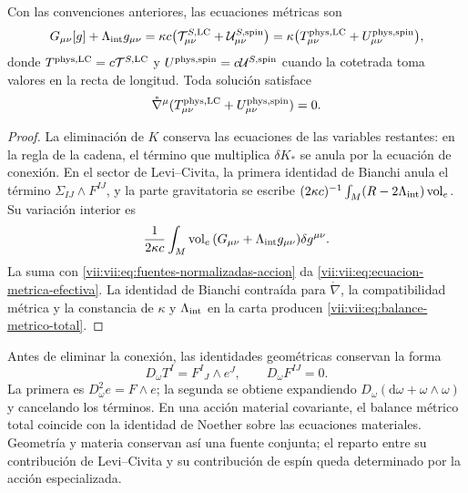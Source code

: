 \begin{proposition}
\label{vii:vii:prop:fuente-metrica-balance}
Con las convenciones anteriores, las ecuaciones métricas son
\begin{equation}
 G_{\mu\nu}[g]+\Lambda_{\rm int}g_{\mu\nu}
 =\kappa c\bigl(\mathcal T^{S,\rm LC}_{\mu\nu}
                    +\mathcal U^{S,\rm spin}_{\mu\nu}\bigr)
 =\kappa\bigl(T^{\rm phys,LC}_{\mu\nu}
                    +U^{\rm phys,spin}_{\mu\nu}\bigr),
 \label{vii:vii:eq:ecuacion-metrica-efectiva}
\end{equation}
donde \(T^{\rm phys,LC}=c\mathcal T^{S,\rm LC}\) y
\(U^{\rm phys,spin}=c\mathcal U^{S,\rm spin}\) cuando la
cotetrada toma valores en la recta de longitud. Toda solución satisface
\begin{equation}
 \mathring\nabla^\mu
   (T^{\rm phys,LC}_{\mu\nu}+U^{\rm phys,spin}_{\mu\nu})=0.
 \label{vii:vii:eq:balance-metrico-total}
\end{equation}
\end{proposition}
\begin{proof}
La eliminación de \(K\) conserva las ecuaciones de las variables
restantes: en la regla de la cadena, el término que multiplica
\(\delta K_*\) se anula por la ecuación de conexión. En el sector
de Levi--Civita, la primera identidad de Bianchi anula el término
\(\Sigma_{IJ}\wedge F^{IJ}\), y la parte gravitatoria se escribe
\((2\kappa c)^{-1}\int_M(R-2\Lambda_{\rm int})\operatorname{vol}_e\).
Su variación interior es
\[
 \frac1{2\kappa c}\int_M\operatorname{vol}_e\,
        (G_{\mu\nu}+\Lambda_{\rm int}g_{\mu\nu})\delta g^{\mu\nu}.
\]
La suma con \eqref{vii:vii:eq:fuentes-normalizadas-accion} da
\eqref{vii:vii:eq:ecuacion-metrica-efectiva}. La identidad de Bianchi
contraída para \(\mathring\nabla\), la compatibilidad métrica y
la constancia de \(\kappa\) y \(\Lambda_{\rm int}\) en la carta
producen \eqref{vii:vii:eq:balance-metrico-total}.
\end{proof}

Antes de eliminar la conexión, las identidades geométricas conservan
la forma
\begin{equation}
 D_\omega T^I=F^I{}_{J}\wedge e^J,\qquad D_\omega F^{IJ}=0.
 \label{vii:vii:eq:bianchi-cartan}
\end{equation}
La primera es \(D_\omega^2e=F\wedge e\); la segunda se obtiene
expandiendo \(D_\omega(\mathrm d\omega+\omega\wedge\omega)\)
y cancelando los términos. En una acción material covariante, el
balance métrico total coincide con la identidad de Noether sobre las
ecuaciones materiales. Geometría y materia conservan así una fuente
conjunta; el reparto entre su contribución de Levi--Civita y su
contribución de espín queda determinado por la acción especializada.
